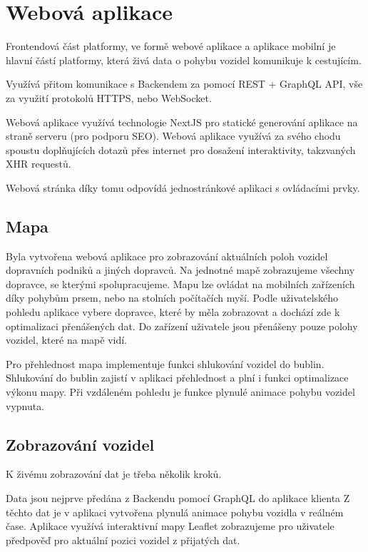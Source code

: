 \section{Webová aplikace}

Frontendová část platformy, ve formě webové aplikace a aplikace mobilní je hlavní částí platformy, která živá data o pohybu vozidel komunikuje k cestujícím.

Využívá přitom komunikace s Backendem za pomocí REST + GraphQL API, vše za využití protokolů HTTPS, nebo WebSocket.

Webová aplikace využívá technologie NextJS pro statické generování aplikace na straně serveru (pro podporu SEO).
Webová aplikace využívá za svého chodu spoustu doplňujících dotazů přes internet pro dosažení interaktivity, takzvaných XHR requestů.

Webová stránka díky tomu odpovídá jednostránkové aplikaci s ovládacími prvky.

\subsection{Mapa}
Byla vytvořena webová aplikace pro zobrazování aktuálních poloh vozidel dopravních podniků a jiných dopravců.
Na jednotné mapě zobrazujeme všechny dopravce, se kterými spolupracujeme.
Mapu lze ovládat na mobilních zařízeních díky pohybům prsem, nebo na stolních počítačích myší. Podle uživatelského pohledu aplikace vybere dopravce, které by měla zobrazovat a dochází zde k optimalizaci přenášených dat. Do zařízení uživatele jsou přenášeny pouze polohy vozidel, které na mapě vidí.

Pro přehlednost mapa implementuje funkci shlukování vozidel do bublin. Shlukování do bublin zajistí v aplikaci přehlednost a plní i funkci optimalizace výkonu mapy.
Při vzdáleném pohledu je funkce plynulé animace pohybu vozidel vypnuta.

\subsection{Zobrazování vozidel}
K živému zobrazování dat je třeba několik kroků.

Data jsou nejprve předána z Backendu pomocí GraphQL do aplikace klienta
Z těchto dat je v aplikaci vytvořena plynulá animace pohybu vozidla v reálném čase.
Aplikace využívá interaktivní mapy Leaflet zobrazujeme pro uživatele předpověď pro aktuální pozici vozidel z přijatých dat.

